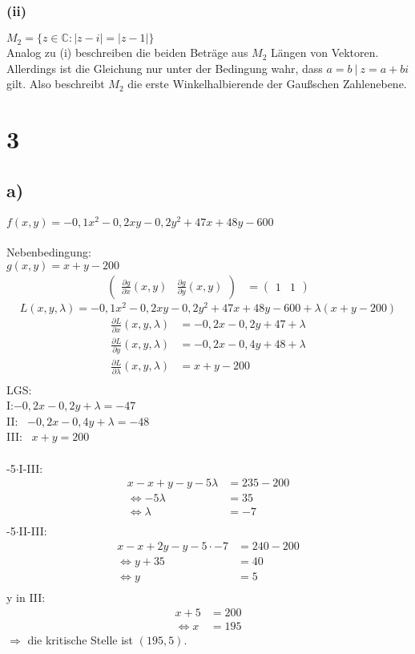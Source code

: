 \documentclass[a4paper]{scrartcl}
\begin{document}
\subsubsection{(ii)}
\(M_2=\Big\{z\in\mathbb{C}:|z-i|=|z-1| \Big\}\) \\
Analog zu (i) beschreiben die beiden Beträge aus \(M_2\) Längen von Vektoren. Allerdings ist die Gleichung nur unter der Bedingung wahr, dass \(a=b\ |\ z=a+bi\) gilt.
Also beschreibt \(M_2\) die erste Winkelhalbierende der Gaußschen Zahlenebene. \\

\section{3}
\subsection{a)}
\(f(x,y)=-0,1x^2-0,2xy-0,2y^2+47x+48y-600\) \\ \\
Nebenbedingung: \\
\(g(x,y)=x+y-200\) \\
\begin{align}
\begin{pmatrix}
\frac{\partial g}{\partial x}(x,y) & \frac{\partial g}{\partial y}(x,y) 
\end{pmatrix}
&=
\begin{pmatrix}
1 & 1
\end{pmatrix}
\end{align}
\[L(x,y,\lambda)=-0,1x^2-0,2xy-0,2y^2+47x+48y-600+\lambda(x+y-200)\]
\begin{align}
\frac{\partial L}{\partial x}(x,y,\lambda)&=-0,2x-0,2y+47+\lambda \\
\frac{\partial L}{\partial y}(x,y,\lambda)&=-0,2x-0,4y+48+\lambda \\
\frac{\partial L}{\partial \lambda}(x,y,\lambda)&=x+y-200 \\
\end{align}
\newpage
LGS: \\
I:\quad\(-0,2x-0,2y+\lambda = -47\) \\
II: \ \(-0,2x-0,4y+\lambda = -48\) \\
III: \ \quad\quad\quad\quad\quad\(x+y =200\) \\ \\
-5\(\cdot\)I-III:
\begin{align}
x-x+y-y-5\lambda &=235-200 \\
\Leftrightarrow 	-5 \lambda &= 35 \\
\Leftrightarrow 	\lambda &= -7 \\
\end{align}
-5\(\cdot\)II-III:
\begin{align}
x-x+2y-y-5\cdot -7 &= 240-200 \\
\Leftrightarrow	y+35&=40 \\
\Leftrightarrow	y&=5 \\
\end{align}
y in III:
\begin{align}
x+5&=200 \\
\Leftrightarrow x &= 195
\end{align}
\(\Rightarrow\) die kritische Stelle ist \((195,5)\).
\end{document}
